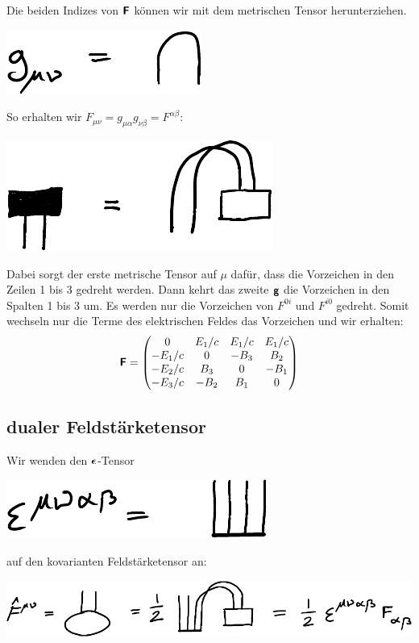Die beiden Indizes von $\boldsymbol{\mathsf{F}}$ können wir mit dem metrischen Tensor
herunterziehen.
\begin{center}
	\includegraphics{H1-Penrose-5-crop.pdf}
\end{center}

So erhalten wir $F_{\mu\nu} = g_{\mu\alpha} g_{\nu\beta} = F^{\alpha\beta}$:
\begin{center}
	\includegraphics{H1-Penrose-10-crop.pdf}
\end{center}

Dabei sorgt der erste metrische Tensor auf $\mu$ dafür, dass die Vorzeichen in
den Zeilen 1 bis 3 gedreht werden. Dann kehrt das zweite $\boldsymbol{\mathsf{g}}$ die
Vorzeichen in den Spalten 1 bis 3 um. Es werden nur die Vorzeichen
von $F^{0i}$ und $F^{i0}$ gedreht. Somit wechseln nur die Terme des
elektrischen Feldes das Vorzeichen und wir erhalten:
\[
	\boldsymbol{\mathsf{F}}
	=
	\begin{pmatrix}
		0 & E_1/c & E_1/c & E_1/c \\
		-E_1/c & 0 & -B_3 & B_2 \\
		-E_2/c & B_3 & 0 & -B_1 \\
		-E_3/c & -B_2 & B_1 & 0 \\
	\end{pmatrix}
\]

\subsection{dualer Feldstärketensor}

Wir wenden den $\boldsymbol{\mathsf{\epsilon}}$-Tensor
\begin{center}
	\includegraphics{H1-Penrose-4-crop.pdf}
\end{center}
auf den kovarianten Feldstärketensor an:
\begin{center}
	\includegraphics{H1-Penrose-3-crop.pdf}
\end{center}

